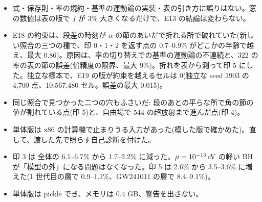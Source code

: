 \begin{result}
\begin{itemize}
\item 式・保存則・率の規約・基準の運動論の実装・表の引き方に誤りはない。窓の数値は表の版で $f$ が 3\% 大きくなるだけで、E13 の結論は変わらない。
\item E18 の約束は、段差の時刻が $\alpha$ の節のあいだで折れる所で破れていた(新しい照合の三つの種で、印 0・1・2 を返す点の 0.7--0.9\% がどこかの年齢で越え、最大 0.86)。原因は、率の切り替えでの基準の運動論の不連続と、322 の率の表の節の誤差(倍精度の限界、最大 9\%)。折れを表から測って印 5 にした。独立な標本で、E19 の版が約束を越えるセルは 0(独立な seed 1903 の 4{,}700 点、10{,}567{,}480 セル。誤差の最大 0.015)。
\item 同じ照合で見つかった二つの穴もふさいだ: 段のあとの平らな所で角の節の値が割れている点(印 5)と、自由場で 544 の超放射まで進んだ点(印 4)。
\item 単体版は x86 の計算機で止まりうる入力があった(模した版で確かめた)。直して、渡した先で照らす自己診断を付けた。
\item 印 3 は 全体の 6.1--6.7\% から 1.7--2.2\% に減った。$\mu=10^{-13}\,\mathrm{eV}$ の軽い BH が「模型の外」になる問題はなくなった。印 5 は 2.6\% から 3.5--3.6\% に増えた(1 世代目の層で 0.9--1.1\%、GW241011 の層で 8.4--9.1\%)。
\item 単体版は pickle でき、メモリは 0.4 GB、警告を出さない。
\end{itemize}
\end{result}

